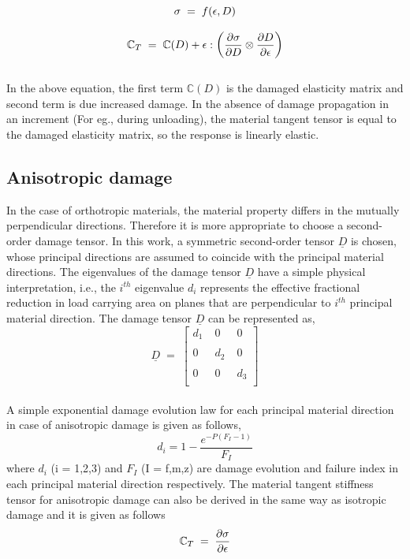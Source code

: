\documentclass[12pt,twoside]{report}
\begin{document}
\begin{equation*}
\large{\sigma  \; = \; f(\epsilon, D) }
\end{equation*}

\begin{equation}
\large{\mathbb{C}_{T}  \; = \; \mathbb{C}(D) + \epsilon : \Big(\frac{\partial \sigma }{\partial D} \otimes \frac{\partial D}{\partial \epsilon}  \Big)    }
\end{equation}
\\
In the above equation, the first term $\mathbb{C}(D)$ is the damaged elasticity matrix and second term is due increased damage. In the absence of damage propagation in an increment (For eg., during unloading), the material tangent tensor is equal to the damaged elasticity matrix, so the response is linearly elastic.
\subsection{Anisotropic damage}
\indent\indent\indent In the case of orthotropic materials, the material property differs in the mutually perpendicular directions. Therefore it is more appropriate to choose a second-order damage tensor. In this work, a symmetric second-order tensor $\underline{D}$ is chosen, whose principal directions are assumed to coincide with the principal material directions. The eigenvalues of the damage tensor $\underline{D}$ have a simple physical interpretation, i.e., the $i^{th}$ eigenvalue $d_{i}$ represents the effective fractional reduction in load carrying area on planes that are perpendicular to $i^{th}$ principal material direction. The damage tensor $\underline{D}$ can be represented as,
\\
$$
\underline{D} \; = \; 
 \begin{bmatrix}
  d_{1}  \;& 0  \; & 0  \\
  \\
  0 \; & d_{2} \; & 0  \\
  \\  
  0 \; & 0 \; & d_{3} \\
  
 \end{bmatrix}
 $$  
\\
A simple exponential damage evolution law for each principal material direction in case of anisotropic damage is given as follows,
\begin{equation}
d_{i} = 1 - \frac{e^{-P(F_{I} - 1)} }{F_{I}}  
\label{exponential damage equation}
\end{equation}
where $d_{i}$ (i = 1,2,3) and $F_{I}$ (I = f,m,z) are damage evolution and failure index in each principal material direction respectively.
The material tangent stiffness tensor for anisotropic damage can also be derived in the same way as isotropic damage and it is given as follows
\begin{equation*}
\large{ \mathbb{C}_{T}  \; = \;\frac{\partial \sigma}{\partial \epsilon}  }
\end{equation*}
\end{document}
